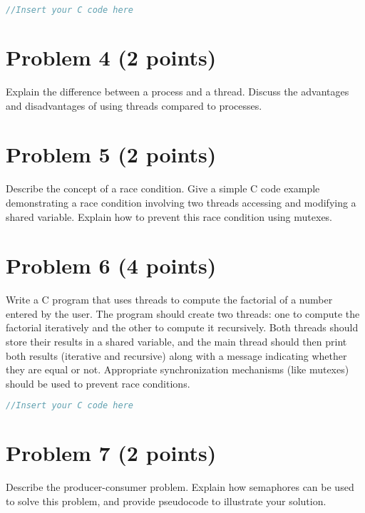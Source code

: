 \documentclass{article}
\begin{document}
\begin{lstlisting}[language=C, caption=Example C Code, basicstyle=\ttfamily\footnotesize]
//Insert your C code here
\end{lstlisting}


\section*{Problem 4 (2 points)}

Explain the difference between a process and a thread.  Discuss the advantages and disadvantages of using threads compared to processes.


\section*{Problem 5 (2 points)}

Describe the concept of a race condition. Give a simple C code example demonstrating a race condition involving two threads accessing and modifying a shared variable. Explain how to prevent this race condition using mutexes.


\section*{Problem 6 (4 points)}

Write a C program that uses threads to compute the factorial of a number entered by the user. The program should create two threads: one to compute the factorial iteratively and the other to compute it recursively.  Both threads should store their results in a shared variable, and the main thread should then print both results (iterative and recursive) along with a message indicating whether they are equal or not.  Appropriate synchronization mechanisms (like mutexes) should be used to prevent race conditions.

\begin{lstlisting}[language=C, caption=Example C Code, basicstyle=\ttfamily\footnotesize]
//Insert your C code here
\end{lstlisting}


\section*{Problem 7 (2 points)}

Describe the producer-consumer problem.  Explain how semaphores can be used to solve this problem, and provide pseudocode to illustrate your solution.
\end{document}
